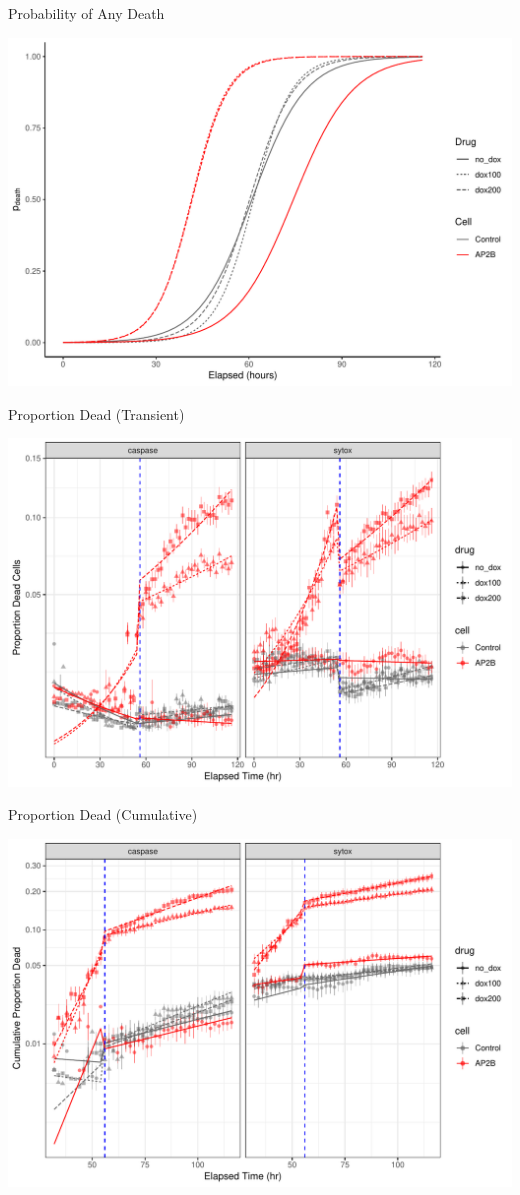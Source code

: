 \documentclass[11pt]{beamer}
\begin{document}
\begin{frame}{Probability of Any Death}

	\center
	\includegraphics[width=0.75\linewidth]{figures/zeroMod.pdf} 	

\end{frame}

\begin{frame}{Proportion Dead (Transient)}

	\center
	\includegraphics[width=0.75\linewidth]{figures/PropDead.pdf} 	

\end{frame}

\begin{frame}{Proportion Dead (Cumulative)}

	\center
	\includegraphics[width=0.75\linewidth]{figures/CumPropDead.pdf} 	

\end{frame}
\end{document}
